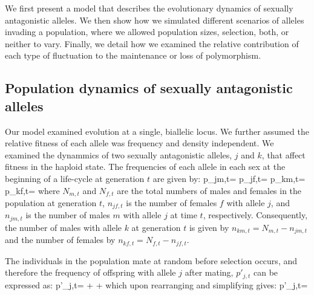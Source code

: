\documentclass[12pt]{article}
\let\oldequation\equation
\let\oldendequation\endequation
\renewenvironment{equation}
  {\linenomathNonumbers\oldequation}
  {\oldendequation\endlinenomath}
\begin{document}
We first present a model that describes the evolutionary dynamics of sexually antagonistic alleles. We then show how we simulated different scenarios of alleles invading a population, where we allowed population sizes, selection, both, or neither to vary. Finally, we detail how we examined the relative contribution of each type of fluctuation to the maintenance or loss of polymorphism.

\subsection*{Population dynamics of sexually antagonistic alleles}


Our model examined evolution at a single, biallelic locus. We further assumed the relative fitness of each allele was frequency and density independent. We examined the dynammics of two  sexually antagonistic alleles, $j$ and $k$, that affect fitness in the haploid state. The frequencies of each allele in each sex at the beginning of a life-cycle at generation $t$ are given by:
\begin{equation}
    p_{jm,t}= 
    \label{first_pop}
\end{equation}
\begin{equation}
    p_{jf,t}= 
\end{equation}
\begin{equation}
    p_{km,t}=  
\end{equation}
\begin{equation}
    p_{kf,t}= 
\end{equation}
where $N_{m,t}$ and $N_{f,t}$ are the total numbers of males and females in the population at generation $t$, $n_{jf,t}$ is the number of females $f$ with allele $j$, and $n_{jm,t}$ is the number of males $m$ with allele $j$ at time $t$, respectively. Consequently, the number of males with allele $k$ at generation $t$ is given by $n_{km,t}=N_{m,t}-n_{jm,t}$ and the number of females by $n_{kf,t}=N_{f,t}-n_{jf,t}$.

The individuals in the population mate at random before selection occurs, and therefore the frequency of offspring with allele $j$ after mating, $p'_{j,t}$ can be expressed as:
\begin{equation}
   p'_{j,t}=   +    +
    
   \label{prime_a}
\end{equation}
which upon rearranging and simplifying gives:
\begin{equation}
   p'_{j,t}= 
   \label{pprime}
\end{equation}
\end{document}
